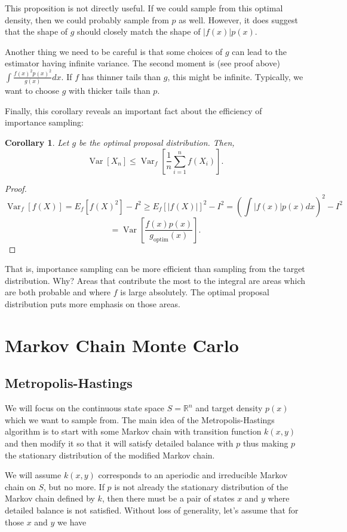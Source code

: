 \documentclass{book}
\theoremstyle{plain}%
\newtheorem{corollary}{Corollary}[section]
\theoremstyle{definition}
\DeclareMathOperator{\Var}{Var}
\begin{document}
This proposition is not directly useful. If we could sample from this optimal density, then we could probably sample from $p$ as well. However, it does suggest that the shape of $g$ should closely match the shape of $|f(x)|p(x)$.

Another thing we need to be careful is that some choices of $g$ can lead to the estimator having infinite variance. The second moment is (see proof above) $\int \frac{f(x)^2p(x)^2}{g(x)}dx$. If $f$ has thinner tails than $g$, this might be infinite. Typically, we want to choose $g$ with thicker tails than $p$.

Finally, this corollary reveals an important fact about the efficiency of importance sampling:

\begin{corollary} Let $g$ be the optimal proposal distribution. Then,
$$\Var[X_n] \leq \Var_f[\frac{1}{n}\sum_{i=1}^n f(X_i)].$$
\end{corollary}

\begin{proof}
$$\Var_f[f(X)] = E_f[f(X)^2] - I^2 \geq E_f[|f(X)|]^2 - I^2 = \left(\int |f(x)|p(x)dx\right)^2 - I^2$$
$$= \Var[\frac{f(x) p(x)}{g_\text{optim}(x)}].$$
\end{proof}

That is, importance sampling can be more efficient than sampling from the target distribution. Why? Areas that contribute the most to the integral are areas which are both probable and where $f$ is large absolutely. The optimal proposal distribution puts more emphasis on those areas.


\chapter{Markov Chain Monte Carlo}\label{ch:mcmc}

\section{Metropolis-Hastings}

We will focus on the continuous state space $S = \mathbb{R}^n$ and target density $p(x)$ which we want to sample from. The main idea of the Metropolis-Hastings algorithm is to start with some Markov chain with transition function $k(x, y)$ and then modify it so that it will satisfy detailed balance with $p$ thus making $p$ the stationary distribution of the modified Markov chain.

We will assume $k(x, y)$ corresponds to an aperiodic and irreducible Markov chain on $S$, but no more. If $p$ is not already the stationary distribution of the Markov chain defined by $k$, then there must be a pair of states $x$ and $y$ where detailed balance is not satisfied. Without loss of generality, let's assume that for those $x$ and $y$ we have
\end{document}

